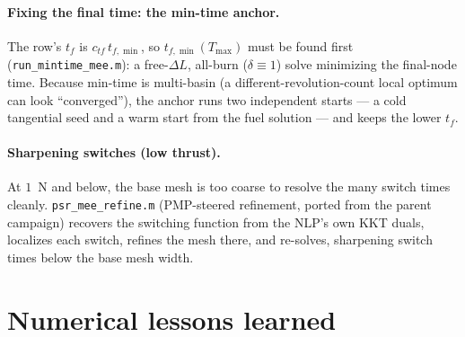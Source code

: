 \documentclass[11pt]{article}
\newcommand{\file}[1]{\texttt{\small #1}}
\newcommand{\Tmax}{T_{\max}}
\begin{document}
\paragraph{Fixing the final time: the min-time anchor.} The row's $t_f$ is
$c_{tf}\,t_{f,\min}$, so $t_{f,\min}(\Tmax)$ must be found first
(\file{run\_mintime\_mee.m}): a free-$\Delta L$, all-burn ($\delta\equiv1$) solve
minimizing the final-node time. Because min-time is multi-basin (a
different-revolution-count local optimum can look ``converged''), the anchor runs
two independent starts --- a cold tangential seed and a warm start from the fuel
solution --- and keeps the lower $t_f$.

\paragraph{Sharpening switches (low thrust).} At $1$~N and below, the base mesh
is too coarse to resolve the many switch times cleanly. \file{psr\_mee\_refine.m}
(PMP-steered refinement, ported from the parent campaign) recovers the switching
function from the NLP's own KKT duals, localizes each switch, refines the mesh
there, and re-solves, sharpening switch times below the base mesh width.

\section{Numerical lessons learned}
\label{sec:lessons}
\end{document}
